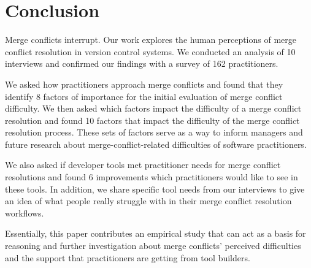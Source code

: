 \section{Conclusion}\label{conclusion}
Merge conflicts interrupt. 
Our work explores the human perceptions of merge conflict resolution in version control systems. We conducted an analysis of 10 interviews and confirmed our findings with a survey of 162 practitioners.

We asked how practitioners approach merge conflicts and found that they identify 8 factors of importance for the initial evaluation of merge conflict difficulty. 
We then asked which factors impact the difficulty of a merge conflict resolution and found 10 factors that impact the difficulty of the merge conflict resolution process. 
These sets of factors serve as a way to inform managers and future research about merge-conflict-related difficulties of software practitioners.

We also asked if developer tools met practitioner needs for merge conflict resolutions and found 6 improvements which practitioners would like to see in these tools. 
In addition, we share specific tool needs from our interviews to give an idea of what people really struggle with in their merge conflict resolution workflows.

Essentially, this paper contributes an empirical study that can act as a basis for reasoning and further investigation about merge conflicts' perceived difficulties and the support that practitioners are getting from tool builders. 